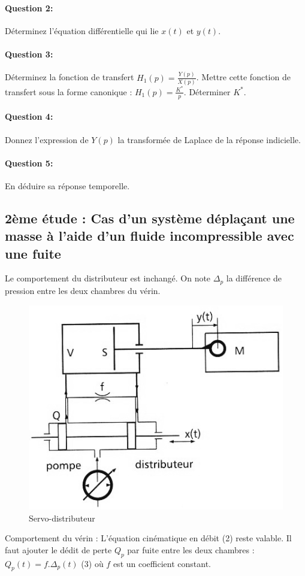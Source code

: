 \paragraph{Question 2:} Déterminez l'équation différentielle qui lie $x(t)$ et $y(t)$.

\paragraph{Question 3:} Déterminez la fonction de transfert $H_1(p)=\frac{Y(p)}{X(p)}$. Mettre cette fonction de transfert sous la forme canonique : $H_1(p)=\frac{K^*}{p}$. Déterminer $K^*$.

\paragraph{Question 4:} Donnez l'expression de $Y(p)$ la transformée de Laplace de la réponse indicielle.

\paragraph{Question 5:} En déduire sa réponse temporelle. 

\subsection{2ème étude : Cas d'un système déplaçant une masse à l'aide d'un fluide incompressible avec une fuite}

Le comportement du distributeur est inchangé.
On note $\Delta_p$ la différence de pression entre les deux chambres du vérin.

\begin{figure}[!h]
 \centering\includegraphics[width=0.4\linewidth]{img/diravi5.png}
 \caption{Servo-distributeur}
 \label{diravi5}
\end{figure}

Comportement du vérin : L'équation cinématique en débit (2) reste valable. Il faut ajouter le dédit de perte $Q_p$ par fuite entre les deux chambres : $Q_p(t)=f.\Delta_p(t)$ (3) où $f$ est un coefficient constant.


